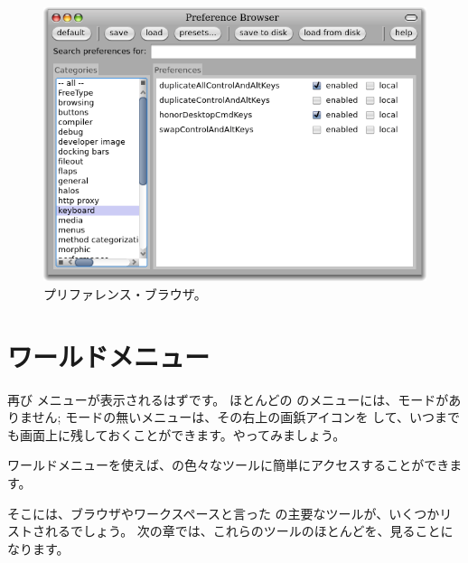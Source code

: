 \documentclass[a4paper,10pt,twoside]{book}
\begin{document}
\begin{figure}[htb]
\centerline{\includegraphics[width=\textwidth]{PreferenceBrowser}}
\caption{プリファレンス・ブラウザ。}
\end{figure}


\section{ワールドメニュー}

再び  メニューが表示されるはずです。
ほとんどの \pharo のメニューには、モードがありません; モードの無いメニューは、その右上の画鋲アイコンを \click して、いつまでも画面上に残しておくことができます。やってみましょう。

ワールドメニューを使えば、\pharo の色々なツールに簡単にアクセスすることができます。


そこには、ブラウザやワークスペースと言った \pharo の主要なツールが、いくつかリストされるでしょう。
次の章では、これらのツールのほとんどを、見ることになります。

\end{document}
